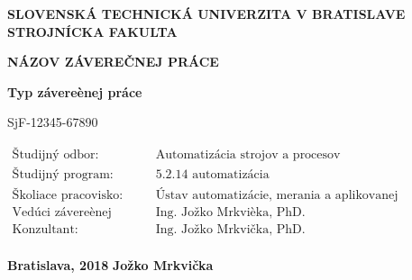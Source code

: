 \thispagestyle{empty}

\noindent \begin{center}
\textbf{{\large{}SLOVENSKÁ TECHNICKÁ UNIVERZITA V BRATISLAVE}}\\
\textbf{{\large{}STROJNÍCKA FAKULTA}}\textbf{\large{} }\\
\vspace{3cm}
\par\end{center}

\noindent \begin{center}
\vspace{3cm}
\par\end{center}



\begin{center}
\textbf{\textsc{\Large{}NÁZOV ZÁVEREČNEJ PRÁCE}}\\
\par\end{center}{\Large \par}

\begin{center}
\textbf{\large{}Typ závereènej práce}\\
\par\end{center}{\large \par}

\begin{center}
{\large{}SjF-12345-67890}\\
\end{center}


\vfill
\begin{flushleft}
$\begin{array}{ll}
\text{Študijný odbor:}&\text{Automatizácia strojov a procesov}\\
\text{Študijný program:}&\text{5.2.14 automatizácia}\\
\text{Školiace pracovisko:}&\text{Ústav automatizácie, merania a aplikovanej informatiky}\\
\text{Vedúci závereènej práce:}&\text{Ing. Jožko Mrkvièka, PhD.}\\
\text{Konzultant:}&\text{Ing. Jožko Mrkvička, PhD.}\\
\end{array}$
\end{flushleft}
\vspace{0.5cm}                                                                      
\noindent \textbf{\large{}Bratislava, 2018} \hfill \textbf{\large{}Jožko Mrkvička}
\cleardoublepage 
